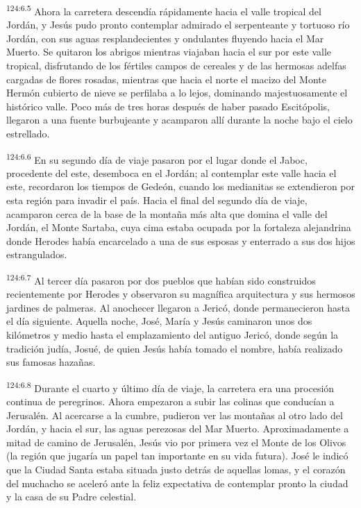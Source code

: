 \par 
\textsuperscript{124:6.5} Ahora la carretera descendía rápidamente hacia el valle tropical del Jordán, y Jesús pudo pronto contemplar admirado el serpenteante y tortuoso río Jordán, con sus aguas resplandecientes y ondulantes fluyendo hacia el Mar Muerto. Se quitaron los abrigos mientras viajaban hacia el sur por este valle tropical, disfrutando de los fértiles campos de cereales y de las hermosas adelfas cargadas de flores rosadas, mientras que hacia el norte el macizo del Monte Hermón cubierto de nieve se perfilaba a lo lejos, dominando majestuosamente el histórico valle. Poco más de tres horas después de haber pasado Escitópolis, llegaron a una fuente burbujeante y acamparon allí durante la noche bajo el cielo estrellado.

\par 
\textsuperscript{124:6.6} En su segundo día de viaje pasaron por el lugar donde el Jaboc, procedente del este, desemboca en el Jordán; al contemplar este valle hacia el este, recordaron los tiempos de Gedeón, cuando los medianitas se extendieron por esta región para invadir el país. Hacia el final del segundo día de viaje, acamparon cerca de la base de la montaña más alta que domina el valle del Jordán, el Monte Sartaba, cuya cima estaba ocupada por la fortaleza alejandrina donde Herodes había encarcelado a una de sus esposas y enterrado a sus dos hijos estrangulados.

\par 
\textsuperscript{124:6.7} Al tercer día pasaron por dos pueblos que habían sido construidos recientemente por Herodes y observaron su magnífica arquitectura y sus hermosos jardines de palmeras. Al anochecer llegaron a Jericó, donde permanecieron hasta el día siguiente. Aquella noche, José, María y Jesús caminaron unos dos kilómetros y medio hasta el emplazamiento del antiguo Jericó, donde según la tradición judía, Josué, de quien Jesús había tomado el nombre, había realizado sus famosas hazañas.

\par 
\textsuperscript{124:6.8} Durante el cuarto y último día de viaje, la carretera era una procesión continua de peregrinos. Ahora empezaron a subir las colinas que conducían a Jerusalén. Al acercarse a la cumbre, pudieron ver las montañas al otro lado del Jordán, y hacia el sur, las aguas perezosas del Mar Muerto. Aproximadamente a mitad de camino de Jerusalén, Jesús vio por primera vez el Monte de los Olivos (la región que jugaría un papel tan importante en su vida futura). José le indicó que la Ciudad Santa estaba situada justo detrás de aquellas lomas, y el corazón del muchacho se aceleró ante la feliz expectativa de contemplar pronto la ciudad y la casa de su Padre celestial.

